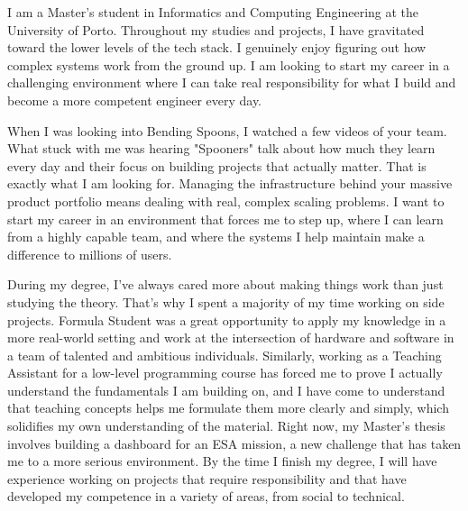 \documentclass[11pt, a4paper]{awesome-cv}
\begin{document}
\makecvheader[R]


\makelettertitle

\begin{cvletter}

I am a Master's student in Informatics and Computing Engineering at the University of Porto. Throughout my studies and projects, I have gravitated toward the lower levels of the tech stack. I genuinely enjoy figuring out how complex systems work from the ground up. I am looking to start my career in a challenging environment where I can take real responsibility for what I build and become a more competent engineer every day.

When I was looking into Bending Spoons, I watched a few videos of your team. What stuck with me was hearing "Spooners" talk about how much they learn every day and their focus on building projects that actually matter. That is exactly what I am looking for. Managing the infrastructure behind your massive product portfolio means dealing with real, complex scaling problems. I want to start my career in an environment that forces me to step up, where I can learn from a highly capable team, and where the systems I help maintain make a difference to millions of users.

During my degree, I've always cared more about making things work than just studying the theory. That's why I spent a majority of my time working on side projects. Formula Student was a great opportunity to apply my knowledge in a more real-world setting and work at the intersection of hardware and software in a team of talented and ambitious individuals. Similarly, working as a Teaching Assistant for a low-level programming course has forced me to prove I actually understand the fundamentals I am building on, and I have come to understand that teaching concepts helps me formulate them more clearly and simply, which solidifies my own understanding of the material. Right now, my Master's thesis involves building a dashboard for an ESA mission, a new challenge that has taken me to a more serious environment. By the time I finish my degree, I will have experience working on projects that require responsibility and that have developed my competence in a variety of areas, from social to technical.


\end{cvletter}
\end{document}
